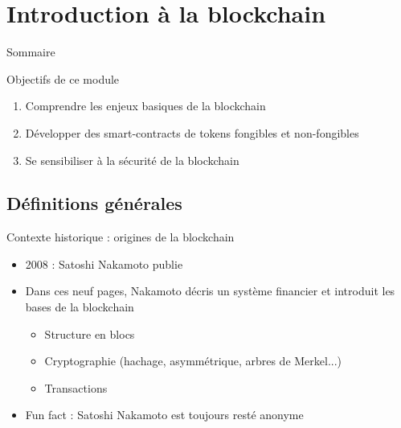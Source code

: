 \section{Introduction à la blockchain}

\begin{frame}{Sommaire}
  \setcounter{tocdepth}{2}
\end{frame}


\begin{frame}{Objectifs de ce module}
  \begin{enumerate}
    \item Comprendre les enjeux basiques de la blockchain
    \item Développer des smart-contracts de tokens fongibles et non-fongibles
    \item Se sensibiliser à la sécurité de la blockchain
  \end{enumerate}
\end{frame}

\subsection{Définitions générales}

\begin{frame}{Contexte historique : origines de la blockchain}
  \begin{itemize}
    \item 2008 : Satoshi Nakamoto publie \href{https://bitcoin.org/bitcoin.pdf}{}
    \item Dans ces neuf pages, Nakamoto décris un système financier et introduit les bases de la blockchain
          \begin{itemize}
            \item Structure en blocs
            \item Cryptographie (hachage, asymmétrique, arbres de Merkel...)
            \item Transactions
          \end{itemize}
    \item Fun fact : Satoshi Nakamoto est toujours resté anonyme
  \end{itemize}
\end{frame}

